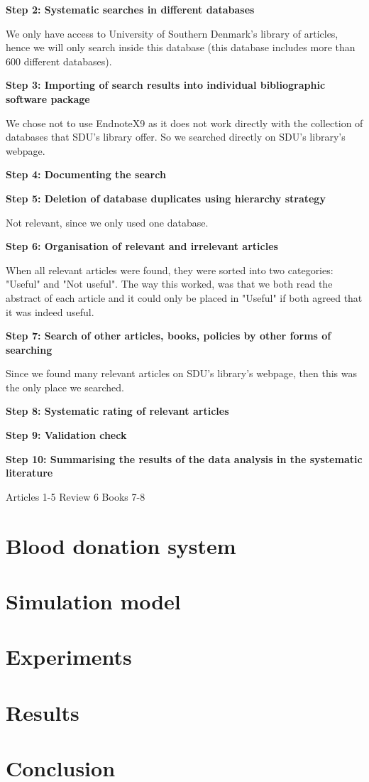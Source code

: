 \documentclass[a4paper,12pt]{article}
\begin{document}
\bigbreak
\textbf{Step 2: Systematic searches in different databases}

We only have access to University of Southern Denmark's library of articles, hence we will only search inside this database (this database includes more than 600 different databases).

\bigbreak
\textbf{Step 3: Importing of search results into individual bibliographic software package}

We chose not to use EndnoteX9 as it does not work directly with the collection of databases that SDU's library offer. So we searched directly on SDU's library's webpage.


\bigbreak
\textbf{Step 4: Documenting the search}

\bigbreak

\textbf{Step 5: Deletion of database duplicates using hierarchy strategy}

Not relevant, since we only used one database.
\bigbreak

\textbf{Step 6: Organisation of relevant and irrelevant articles }

When all relevant articles were found, they were sorted into two categories: "Useful" and "Not useful". The way this worked, was that we both read the abstract of each article and it could only be placed in "Useful" if both agreed that it was indeed useful.
\bigbreak

\textbf{Step 7: Search of other articles, books, policies by other forms of searching }

Since we found many relevant articles on SDU's library's webpage, then this was the only place we searched.
\bigbreak

\textbf{Step 8: Systematic rating of relevant articles }


\bigbreak

\textbf{Step 9: Validation check }

\bigbreak

\textbf{Step 10: Summarising the results of the data analysis in the systematic literature}

\bigbreak


Articles 1-5
Review 6
Books 7-8

\section*{Blood donation system}

\section*{Simulation model}

\section*{Experiments}

\section*{Results}

\section*{Conclusion}

\newpage



\end{document}
